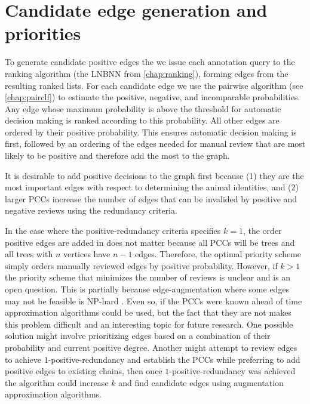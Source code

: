 

\section{Candidate edge generation and priorities}\label{sec:cand}

To generate candidate positive edges the we issue each annotation query to the ranking algorithm (the LNBNN from
\cref{chap:ranking}), forming edges from the resulting ranked lists. For each candidate edge we use the pairwise
algorithm (see \cref{chap:pairclf}) to estimate the positive, negative, and incomparable probabilities. Any edge
whose maximum probability is above the threshold for automatic decision making is ranked according to this
probability. All other edges are ordered by their positive probability. This ensures automatic decision making is
first, followed by an ordering of the edges needed for manual review that are most likely to be positive and
therefore add the most to the graph.

It is desirable to add positive decisions to the graph first because (1) they are the most important edges with
respect to determining the animal identities, and (2) larger PCCs increase the number of edges that can be
invalided by positive and negative reviews using the redundancy criteria.

In the case where the positive-redundancy criteria specifies $k=1$, the order positive edges are added in does not
matter because all PCCs will be trees and all trees with $n$ vertices have $n-1$ edges. Therefore, the optimal
priority scheme simply orders manually reviewed edges by positive probability. However, if $k>1$ the priority
scheme that minimizes the number of reviews is unclear and is an open question. This is partially because
edge-augmentation where some edges may not be feasible is NP-hard \cite{khuller_approximation_1993}. Even so, if
the PCCs were known ahead of time approximation algorithms could be used, but the fact that they are not makes this
problem difficult and an interesting topic for future research. One possible solution might involve prioritizing
edges based on a combination of their probability and current positive degree. Another might attempt to review
edges to achieve $1$-positive-redundancy and establish the PCCs while preferring to add positive edges to existing
chains, then once $1$-positive-redundancy was achieved the algorithm could increase $k$ and find candidate edges
using augmentation approximation algorithms.

